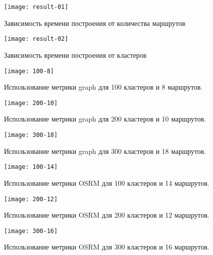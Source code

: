 \begin{figure}[ht!]
    \centering
    \texttt{[image: result-01]}
    \caption{Зависимость времени построения от количества маршрутов}
    \label{fig:result-01}
\end{figure}

\begin{figure}[ht!]
    \centering
    \texttt{[image: result-02]}
    \caption{Зависимость времени построения от кластеров}
    \label{fig:result-02}
\end{figure}

\begin{figure}[ht!]
    \centering
    \texttt{[image: 100-8]}
    \caption{Использование метрики graph для 100 кластеров и 8 маршрутов.}
    \label{fig:network-01a}
\end{figure}

\begin{figure}[ht!]
    \centering
    \texttt{[image: 200-10]}
    \caption{Использование метрики graph для 200 кластеров и 10 маршрутов.}
    \label{fig:network-01b}
\end{figure}

\begin{figure}[ht!]
    \centering
    \texttt{[image: 300-18]}
    \caption{Использование метрики graph для 300 кластеров и 18 маршрутов.}
    \label{fig:network-01c}
\end{figure}

\begin{figure}[ht!]
    \centering
    \texttt{[image: 100-14]}
    \caption{Использование метрики OSRM для 100 кластеров и 14 маршрутов.}
    \label{fig:network-02a}
\end{figure}

\begin{figure}[ht!]
    \centering
    \texttt{[image: 200-12]}
    \caption{Использование метрики OSRM для 200 кластеров и 12 маршрутов.}
    \label{fig:network-02b}
\end{figure}

\begin{figure}[ht!]
    \centering
    \texttt{[image: 300-16]}
    \caption{Использование метрики OSRM для 300 кластеров и 16 маршрутов.}
    \label{fig:network-02c}
\end{figure}

\clearpage

